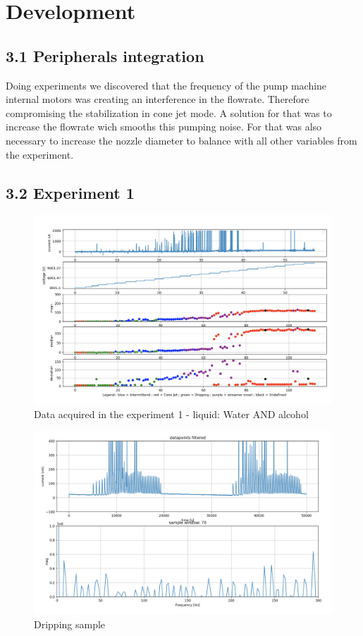 \section{Development}

\subsection*{3.1 Peripherals integration}



Doing experiments we discovered that the frequency of the pump machine internal motors was
creating an interference in the flowrate. Therefore compromising the stabilization in cone jet mode.
A solution for that was to increase the flowrate wich smooths this pumping noise. For that was also necessary
to increase the nozzle diameter to balance with all other variables from the experiment.


\subsection*{3.2 Experiment 1}

\begin{figure}[H]
    \center
    \includegraphics[width=18cm]{images/images_folder_2/img1.png}
    \caption{Data acquired in the experiment 1 - liquid: Water AND alcohol}
\end{figure}

\begin{figure}[H]
    \center
    \includegraphics[width=12cm]{images/images_folder_2/img2.png}
    \caption{Dripping sample}
\end{figure}

